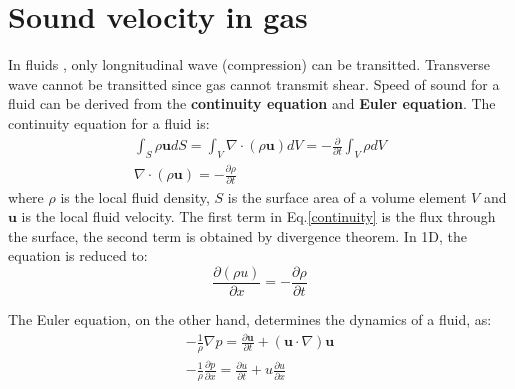 \documentclass{article}
\begin{document}
\section{Sound velocity in gas}
In fluids , only longnitudinal wave (compression) can be transitted. Transverse wave cannot be transitted since gas cannot transmit shear.
Speed of sound for a fluid can be derived from the \textbf{continuity equation} and \textbf{Euler equation}. 
The continuity equation for a fluid is:
\begin{gather}
    \int_S \rho \textbf{u} dS = \int_V \nabla\cdot(\rho \textbf{u}) dV = -\frac{\partial}{\partial t} \int_V \rho dV \label{continuity}\\
    \nabla\cdot(\rho \textbf{u}) = - \frac{\partial \rho}{\partial t}
\end{gather} 
where $\rho$ is the local fluid density, $S$ is the surface area of a volume element $V$ and $\textbf{u}$ is the 
local fluid velocity. The first term in Eq.\ref{continuity} is the flux through the surface, the second term is obtained 
by divergence theorem. In 1D, the equation is reduced to:
\begin{equation}
    \frac{\partial (\rho u)}{\partial x} = - \frac{\partial \rho}{\partial t}
\end{equation}

The Euler equation, on the other hand, determines the dynamics of a fluid, as:
\begin{gather}
    -\frac{1}{\rho} \nabla p = \frac{\partial \textbf{u}}{\partial t} + (\textbf{u} \cdot \nabla) \textbf{u} \\
    -\frac{1}{\rho} \frac{\partial p}{\partial x} = \frac{\partial u}{\partial t} + u \frac{\partial u}{\partial x}
\end{gather}
\end{document}

